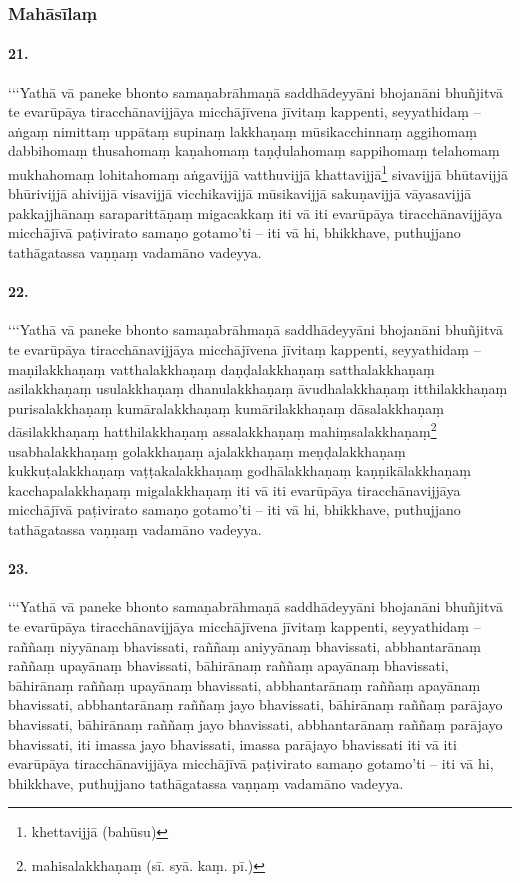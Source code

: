 
\subsubsection{Mahāsīlaṃ}

\paragraph{21.}
‘‘‘Yathā vā paneke bhonto samaṇabrāhmaṇā saddhādeyyāni bhojanāni bhuñjitvā te evarūpāya tiracchānavijjāya micchājīvena jīvitaṃ kappenti, seyyathidaṃ – aṅgaṃ nimittaṃ uppātaṃ supinaṃ lakkhaṇaṃ mūsikacchinnaṃ aggihomaṃ dabbihomaṃ thusahomaṃ kaṇahomaṃ taṇḍulahomaṃ sappihomaṃ telahomaṃ mukhahomaṃ lohitahomaṃ aṅgavijjā vatthuvijjā khattavijjā\footnote{khettavijjā (bahūsu)} sivavijjā bhūtavijjā bhūrivijjā ahivijjā visavijjā vicchikavijjā mūsikavijjā sakuṇavijjā vāyasavijjā pakkajjhānaṃ saraparittāṇaṃ migacakkaṃ iti vā iti evarūpāya tiracchānavijjāya micchājīvā paṭivirato samaṇo gotamo’ti – iti vā hi, bhikkhave, puthujjano tathāgatassa vaṇṇaṃ vadamāno vadeyya.

\paragraph{22.}
‘‘‘Yathā vā paneke bhonto samaṇabrāhmaṇā saddhādeyyāni bhojanāni bhuñjitvā te evarūpāya tiracchānavijjāya micchājīvena jīvitaṃ kappenti, seyyathidaṃ – maṇilakkhaṇaṃ vatthalakkhaṇaṃ daṇḍalakkhaṇaṃ satthalakkhaṇaṃ asilakkhaṇaṃ usulakkhaṇaṃ dhanulakkhaṇaṃ āvudhalakkhaṇaṃ itthilakkhaṇaṃ purisalakkhaṇaṃ kumāralakkhaṇaṃ kumārilakkhaṇaṃ dāsalakkhaṇaṃ dāsilakkhaṇaṃ hatthilakkhaṇaṃ assalakkhaṇaṃ mahiṃsalakkhaṇaṃ\footnote{mahisalakkhaṇaṃ (sī. syā. kaṃ. pī.)} usabhalakkhaṇaṃ golakkhaṇaṃ ajalakkhaṇaṃ meṇḍalakkhaṇaṃ kukkuṭalakkhaṇaṃ vaṭṭakalakkhaṇaṃ godhālakkhaṇaṃ kaṇṇikālakkhaṇaṃ kacchapalakkhaṇaṃ migalakkhaṇaṃ iti vā iti evarūpāya tiracchānavijjāya micchājīvā paṭivirato samaṇo gotamo’ti – iti vā hi, bhikkhave, puthujjano tathāgatassa vaṇṇaṃ vadamāno vadeyya.
\paragraph{23.}
‘‘‘Yathā vā paneke bhonto samaṇabrāhmaṇā saddhādeyyāni bhojanāni bhuñjitvā te evarūpāya tiracchānavijjāya micchājīvena jīvitaṃ kappenti, seyyathidaṃ – raññaṃ niyyānaṃ bhavissati, raññaṃ aniyyānaṃ bhavissati, abbhantarānaṃ raññaṃ upayānaṃ bhavissati, bāhirānaṃ raññaṃ apayānaṃ bhavissati, bāhirānaṃ raññaṃ upayānaṃ bhavissati, abbhantarānaṃ raññaṃ apayānaṃ bhavissati, abbhantarānaṃ raññaṃ jayo bhavissati, bāhirānaṃ raññaṃ parājayo bhavissati, bāhirānaṃ raññaṃ jayo bhavissati, abbhantarānaṃ raññaṃ parājayo bhavissati, iti imassa jayo bhavissati, imassa parājayo bhavissati iti vā iti evarūpāya tiracchānavijjāya micchājīvā paṭivirato samaṇo gotamo’ti – iti vā hi, bhikkhave, puthujjano tathāgatassa vaṇṇaṃ vadamāno vadeyya.


